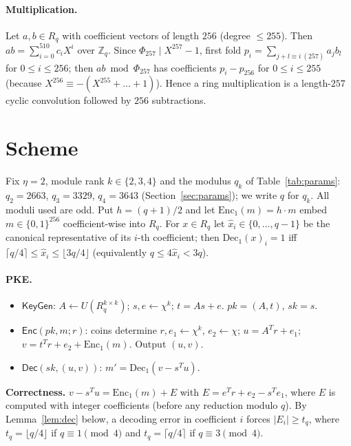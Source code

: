 \documentclass[11pt]{article}
\theoremstyle{remark}
\newcommand{\Z}{\mathbb{Z}}
\newcommand{\Rq}{R_q}
\begin{document}
\paragraph{Multiplication.} Let $a,b\in\Rq$ with coefficient vectors of length $256$ (degree $\le255$). Then $ab=\sum_{i=0}^{510}c_iX^i$ over $\Z_q$. Since $\Phi_{257}\mid X^{257}-1$, first fold $p_i=\sum_{j+l\equiv i\ (257)}a_jb_l$ for $0\le i\le256$; then $ab\bmod\Phi_{257}$ has coefficients $p_i-p_{256}$ for $0\le i\le255$ (because $X^{256}\equiv-(X^{255}+\dots+1)$). Hence a ring multiplication is a length-$257$ cyclic convolution followed by $256$ subtractions.

\section{Scheme}\label{sec:scheme}
Fix $\eta=2$, module rank $k\in\{2,3,4\}$ and the modulus $q_k$ of Table~\ref{tab:params}: $q_2=2663$, $q_3=3329$, $q_4=3643$ (Section~\ref{sec:params}); we write $q$ for $q_k$. All moduli used are odd. Put $h=(q+1)/2$ and let $\mathrm{Enc}_1(m)=h\cdot m$ embed $m\in\{0,1\}^{256}$ coefficient-wise into $\Rq$. For $x\in\Rq$ let $\hat x_i\in\{0,\dots,q-1\}$ be the canonical representative of its $i$-th coefficient; then $\mathrm{Dec}_1(x)_i=1$ iff $\lceil q/4\rceil\le\hat x_i\le\lfloor 3q/4\rfloor$ (equivalently $q\le4\hat x_i<3q$).

\paragraph{PKE.}
\begin{itemize}[nosep]
\item $\mathsf{KeyGen}$: $A\leftarrow U(\Rq^{k\times k})$; $s,e\leftarrow\chi^k$; $t=As+e$. $pk=(A,t)$, $sk=s$.
\item $\mathsf{Enc}(pk,m;r)$: coins determine $r,e_1\leftarrow\chi^k$, $e_2\leftarrow\chi$; $u=A^{T}r+e_1$; $v=t^{T}r+e_2+\mathrm{Enc}_1(m)$. Output $(u,v)$.
\item $\mathsf{Dec}(sk,(u,v))$: $m'=\mathrm{Dec}_1(v-s^{T}u)$.
\end{itemize}
\textbf{Correctness.} $v-s^{T}u=\mathrm{Enc}_1(m)+E$ with $E=e^{T}r+e_2-s^{T}e_1$, where $E$ is computed with integer coefficients (before any reduction modulo $q$). By Lemma~\ref{lem:dec} below, a decoding error in coefficient $i$ forces $|E_i|\ge t_q$, where $t_q=\lfloor q/4\rfloor$ if $q\equiv1\pmod4$ and $t_q=\lceil q/4\rceil$ if $q\equiv3\pmod4$.
\end{document}
